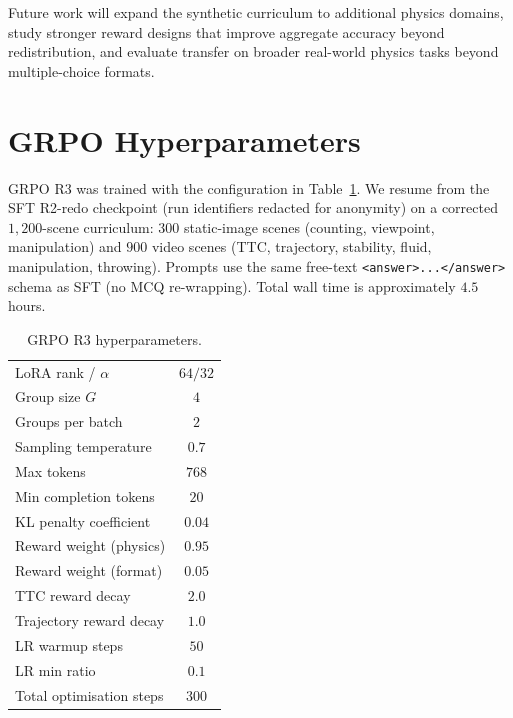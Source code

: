 \documentclass{article}
\begin{document}
Future work will expand the synthetic curriculum to additional physics
domains, study stronger reward designs that improve aggregate accuracy
beyond redistribution, and evaluate transfer on broader real-world
physics tasks beyond multiple-choice formats.

\newpage



\appendix

\section{GRPO Hyperparameters}
\label{sec:appendix-grpo}

GRPO R3 was trained with the configuration in
Table~\ref{tab:grpo-hp}. We resume from the SFT R2-redo
checkpoint (run identifiers redacted for anonymity) on a corrected
$1{,}200$-scene curriculum: $300$ static-image scenes (counting,
viewpoint, manipulation) and $900$ video scenes (TTC, trajectory,
stability, fluid, manipulation, throwing). Prompts use the same
free-text \texttt{<answer>...</answer>} schema as SFT (no MCQ
re-wrapping). Total wall time is approximately $4.5$ hours.

\begin{table}[h]
\caption{GRPO R3 hyperparameters.}
\label{tab:grpo-hp}
\centering
\small
\begin{tabular}{lc}
\toprule
LoRA rank / $\alpha$            & $64 / 32$ \\
Group size $G$                  & $4$ \\
Groups per batch                & $2$ \\
Sampling temperature            & $0.7$ \\
Max tokens                      & $768$ \\
Min completion tokens           & $20$ \\
KL penalty coefficient          & $0.04$ \\
Reward weight (physics)         & $0.95$ \\
Reward weight (format)          & $0.05$ \\
TTC reward decay                & $2.0$ \\
Trajectory reward decay         & $1.0$ \\
LR warmup steps                 & $50$ \\
LR min ratio                    & $0.1$ \\
Total optimisation steps        & $300$ \\
\bottomrule
\end{tabular}
\end{table}
\end{document}
